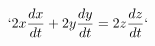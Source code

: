 \documentclass[preview]{standalone}
\begin{document}
\begin{align*}
`2x \frac{dx}{dt} + 2y \frac{dy}{dt} = 2z \frac{dz}{dt}`
\end{align*}
\end{document}
